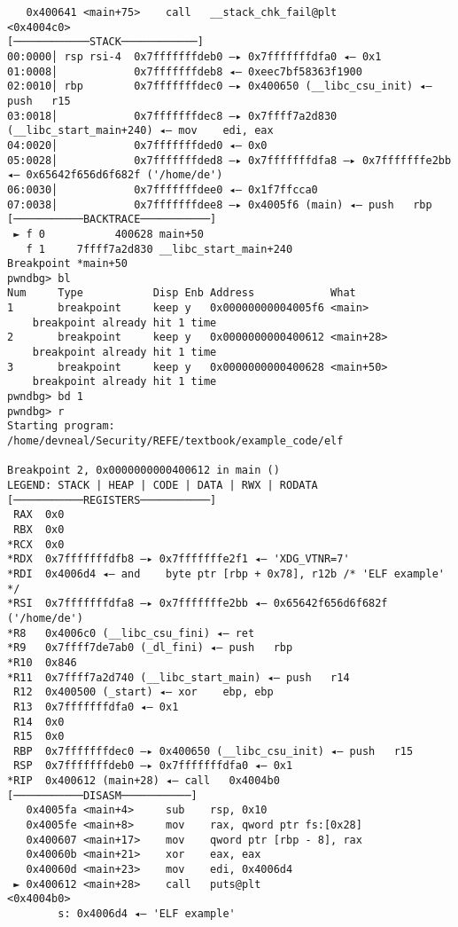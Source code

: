 \begin{lstlisting}
   0x400641 <main+75>    call   __stack_chk_fail@plt          <0x4004c0>
[────────────STACK────────────]
00:0000│ rsp rsi-4  0x7fffffffdeb0 —▸ 0x7fffffffdfa0 ◂— 0x1
01:0008│            0x7fffffffdeb8 ◂— 0xeec7bf58363f1900
02:0010│ rbp        0x7fffffffdec0 —▸ 0x400650 (__libc_csu_init) ◂— push   r15
03:0018│            0x7fffffffdec8 —▸ 0x7ffff7a2d830 (__libc_start_main+240) ◂— mov    edi, eax
04:0020│            0x7fffffffded0 ◂— 0x0
05:0028│            0x7fffffffded8 —▸ 0x7fffffffdfa8 —▸ 0x7fffffffe2bb ◂— 0x65642f656d6f682f ('/home/de')
06:0030│            0x7fffffffdee0 ◂— 0x1f7ffcca0
07:0038│            0x7fffffffdee8 —▸ 0x4005f6 (main) ◂— push   rbp
[───────────BACKTRACE───────────]
 ► f 0           400628 main+50
   f 1     7ffff7a2d830 __libc_start_main+240
Breakpoint *main+50
pwndbg> bl
Num     Type           Disp Enb Address            What
1       breakpoint     keep y   0x00000000004005f6 <main>
	breakpoint already hit 1 time
2       breakpoint     keep y   0x0000000000400612 <main+28>
	breakpoint already hit 1 time
3       breakpoint     keep y   0x0000000000400628 <main+50>
	breakpoint already hit 1 time
pwndbg> bd 1
pwndbg> r
Starting program: /home/devneal/Security/REFE/textbook/example_code/elf 

Breakpoint 2, 0x0000000000400612 in main ()
LEGEND: STACK | HEAP | CODE | DATA | RWX | RODATA
[───────────REGISTERS───────────]
 RAX  0x0
 RBX  0x0
*RCX  0x0
*RDX  0x7fffffffdfb8 —▸ 0x7fffffffe2f1 ◂— 'XDG_VTNR=7'
*RDI  0x4006d4 ◂— and    byte ptr [rbp + 0x78], r12b /* 'ELF example' */
*RSI  0x7fffffffdfa8 —▸ 0x7fffffffe2bb ◂— 0x65642f656d6f682f ('/home/de')
*R8   0x4006c0 (__libc_csu_fini) ◂— ret    
*R9   0x7ffff7de7ab0 (_dl_fini) ◂— push   rbp
*R10  0x846
*R11  0x7ffff7a2d740 (__libc_start_main) ◂— push   r14
 R12  0x400500 (_start) ◂— xor    ebp, ebp
 R13  0x7fffffffdfa0 ◂— 0x1
 R14  0x0
 R15  0x0
 RBP  0x7fffffffdec0 —▸ 0x400650 (__libc_csu_init) ◂— push   r15
 RSP  0x7fffffffdeb0 —▸ 0x7fffffffdfa0 ◂— 0x1
*RIP  0x400612 (main+28) ◂— call   0x4004b0
[───────────DISASM───────────]
   0x4005fa <main+4>     sub    rsp, 0x10
   0x4005fe <main+8>     mov    rax, qword ptr fs:[0x28]
   0x400607 <main+17>    mov    qword ptr [rbp - 8], rax
   0x40060b <main+21>    xor    eax, eax
   0x40060d <main+23>    mov    edi, 0x4006d4
 ► 0x400612 <main+28>    call   puts@plt                      <0x4004b0>
        s: 0x4006d4 ◂— 'ELF example'
 

\end{lstlisting}
